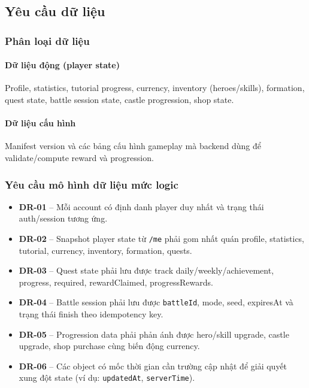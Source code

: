\subsection{Yêu cầu dữ liệu}
\label{subsec:req-data}

\subsubsection{Phân loại dữ liệu}

\paragraph{Dữ liệu động (player state)}
Profile, statistics, tutorial progress, currency, inventory (heroes/skills), formation, quest state, battle session state, castle progression, shop state.

\paragraph{Dữ liệu cấu hình}
Manifest version và các bảng cấu hình gameplay mà backend dùng để validate/compute reward và progression.

\subsubsection{Yêu cầu mô hình dữ liệu mức logic}
\begin{itemize}
    \item \textbf{DR-01} -- Mỗi account có định danh player duy nhất và trạng thái auth/session tương ứng.
    \item \textbf{DR-02} -- Snapshot player state từ \texttt{/me} phải gom nhất quán profile, statistics, tutorial, currency, inventory, formation, quests.
    \item \textbf{DR-03} -- Quest state phải lưu được track daily/weekly/achievement, progress, required, rewardClaimed, progressRewards.
    \item \textbf{DR-04} -- Battle session phải lưu được \texttt{battleId}, mode, seed, expiresAt và trạng thái finish theo idempotency key.
    \item \textbf{DR-05} -- Progression data phải phản ánh được hero/skill upgrade, castle upgrade, shop purchase cùng biến động currency.
    \item \textbf{DR-06} -- Các object có mốc thời gian cần trường cập nhật để giải quyết xung đột state (ví dụ: \texttt{updatedAt}, \texttt{serverTime}).
\end{itemize}

